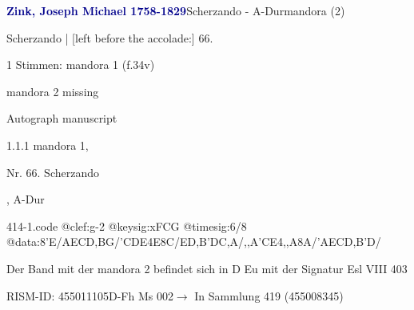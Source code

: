\documentclass[twocolumn, 12pt]{book}
\begin{document}
\par \vspace{16pt} \textcolor{darkblue}{\textbf{Zink, Joseph Michael  1758-1829}}\hfillplus{\textbf{[414]}}\newline Scherzando - A-Dur\newline mandora (2)
\par \begin{itshape}[f.34v, at left:] Scherzando | [left before the accolade:] 66.\end{itshape} 
\par \textcolor{darkblue}{}  1 Stimmen: mandora 1  (f.34v)\newline \begin{small} mandora 2 missing\end{small} \newline Autograph manuscript
\par 1.1.1  mandora 1, \begin{itshape}Nr. 66. Scherzando\end{itshape}, A-Dur  
\begin{filecontents*}{414-1.code}
@clef:g-2
@keysig:xFCG
@timesig:6/8
@data:8'E/AECD,BG/'CDE4E8C/ED,B'DC,A/,,A'CE4,,A8A/'AECD,B'D/
\end{filecontents*}
\newline %
\par Der Band mit der mandora 2 befindet sich in D Eu mit der Signatur Esl VIII 403
\par RISM-ID: 455011105\newline D-Fh  Ms 002\newline $\rightarrow$ In Sammlung 419 (455008345)
      
\end{document}
